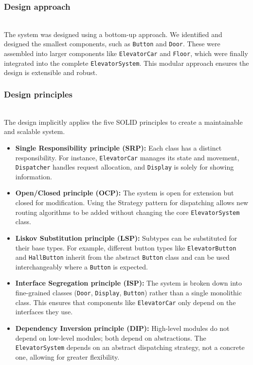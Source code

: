 \subsubsection{Design approach}\label{M2vdGptiiAH0BbBV31gVp}
\\
The system was designed using a bottom-up approach. We identified and designed the smallest components, such as \texttt{Button} and \texttt{Door}. These were assembled into larger components like \texttt{ElevatorCar} and \texttt{Floor}, which were finally integrated into the complete \texttt{ElevatorSystem}. This modular approach ensures the design is extensible and robust.

\subsubsection{Design principles}\label{iVHtxm8THk2l_Np8qTWS1}
\\
The design implicitly applies the five SOLID principles to create a maintainable and scalable system.

\begin{itemize}
\item
\protect{}\label{5hQa8zVS2J2Za25JBsiSw}
\textbf{Single Responsibility principle (SRP):} Each class has a distinct responsibility. For instance, \texttt{ElevatorCar} manages its state and movement, \texttt{Dispatcher} handles request allocation, and \texttt{Display} is solely for showing information.
\item
\protect{}\label{bKqJtPqZ0fAvnX6Wz7h_z}
\textbf{Open/Closed principle (OCP):} The system is open for extension but closed for modification. Using the Strategy pattern for dispatching allows new routing algorithms to be added without changing the core \texttt{ElevatorSystem} class.
\item
\protect{}\label{ZZZ1RtFNiFb2DLY3x0vts}
\textbf{Liskov Substitution principle (LSP):} Subtypes can be substituted for their base types. For example, different button types like \texttt{ElevatorButton} and \texttt{HallButton} inherit from the abstract \texttt{Button} class and can be used interchangeably where a \texttt{Button} is expected.
\item
\protect{}\label{YzvN2wmea3Tp1DcNO0GwR}
\textbf{Interface Segregation principle (ISP):} The system is broken down into fine-grained classes (\texttt{Door}, \texttt{Display}, \texttt{Button}) rather than a single monolithic class. This ensures that components like \texttt{ElevatorCar} only depend on the interfaces they use.
\item
\protect{}\label{piVGS7hxMskioJnatGm6n}
\textbf{Dependency Inversion principle (DIP):} High-level modules do not depend on low-level modules; both depend on abstractions. The \texttt{ElevatorSystem} depends on an abstract dispatching strategy, not a concrete one, allowing for greater flexibility.
\end{itemize}

